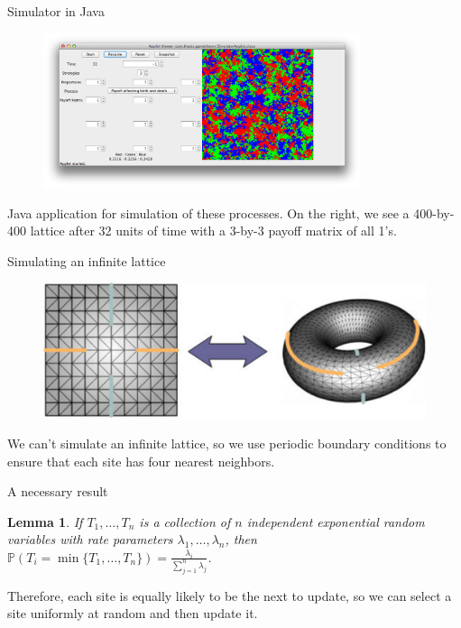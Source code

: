 \documentclass{beamer}
\newcommand{\pr}{\mathbb{P}}
\newtheorem{lem}{Lemma}
\begin{document}
\begin{frame}[c]{Simulator in Java}
\begin{figure}
  \includegraphics[width=0.83\textwidth]{./images/simulator_screenshot.png}
\end{figure}
\begin{block}{}
  \small{Java application for simulation of these processes. On the right, we see a 400-by-400 lattice after 32 units of time with a 3-by-3 payoff matrix of all 1's.}
\end{block}
\end{frame}

\begin{frame}{Simulating an infinite lattice}
\begin{figure}
  \includegraphics[width=.8\textwidth]{./images/torus.eps}
\end{figure}
\begin{block}{}
  We can't simulate an infinite lattice, so we use periodic boundary conditions to ensure that each site has four nearest neighbors.
\end{block}
\end{frame}

\begin{frame}{A necessary result}
\begin{lem}
  If $T_1,\dots, T_n$ is a collection of $n$ independent exponential
  random variables with rate parameters $\lambda_1,\dots, \lambda_n$,
  then $\pr\left( T_i = \min\{T_1,\dots, T_n\} \right) = \frac{\lambda_i}{\sum_{j=1}^n\lambda_j}$.
\end{lem}

\begin{block}{}
Therefore, each site is equally likely to be the next to update, so we can select a site uniformly at random and then update it.
\end{block}
\end{frame}
\end{document}
